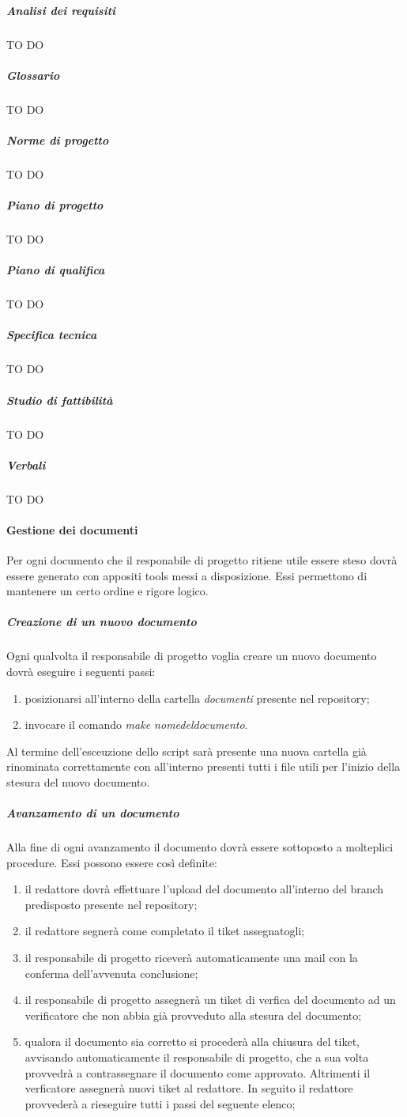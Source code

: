 			\subparagraph{Analisi dei requisiti}
				TO DO
			\subparagraph{Glossario}
				TO DO
			\subparagraph{Norme di progetto}
				TO DO
			\subparagraph{Piano di progetto}
				TO DO
			\subparagraph{Piano di qualifica}
				TO DO
			\subparagraph{Specifica tecnica}
				TO DO
			\subparagraph{Studio di fattibilità}
				TO DO
			\subparagraph{Verbali}
				TO DO
	
	
	
		\paragraph{Gestione dei documenti}
		Per ogni documento che il responabile di progetto ritiene utile essere steso dovrà essere generato con appositi tools messi a disposizione. Essi permettono di mantenere un certo ordine e rigore logico.  

				\subparagraph{Creazione di un nuovo documento}
				Ogni qualvolta il responsabile di progetto voglia creare un nuovo documento dovrà eseguire i seguenti passi:
				\begin{enumerate}
					\item posizionarsi all'interno della cartella \emph{documenti} presente nel repository;
					\item invocare il comando \emph{make nome\textunderscore del\textunderscore documento}.
				\end{enumerate}
				Al termine dell'esceuzione dello script sarà presente una nuova cartella già rinominata correttamente con all'interno presenti tutti i file utili per l'inizio della stesura del nuovo documento.
				
				\subparagraph{Avanzamento di un documento}
				Alla fine di ogni avanzamento il documento dovrà essere sottoposto a molteplici procedure. Essi possono essere così definite:
				\begin{enumerate}
					\item il redattore dovrà effettuare l'upload del documento all'interno del branch predisposto presente nel repository;
					\item il redattore segnerà come completato il tiket assegnatogli;
					\item il responsabile di progetto riceverà automaticamente una mail con la conferma dell'avvenuta conclusione;
					\item il responsabile di progetto assegnerà un tiket di verfica del documento ad un verificatore che non abbia già provveduto alla stesura del documento;
					\item qualora il documento sia corretto si procederà alla chiusura del tiket, avvisando automaticamente il responsabile di progetto, che a sua volta provvedrà a contrassegnare il documento come approvato. Altrimenti il verficatore assegnerà nuovi tiket al redattore. In seguito il redattore provvederà a rieseguire tutti i passi del seguente elenco;
				\end{enumerate}


